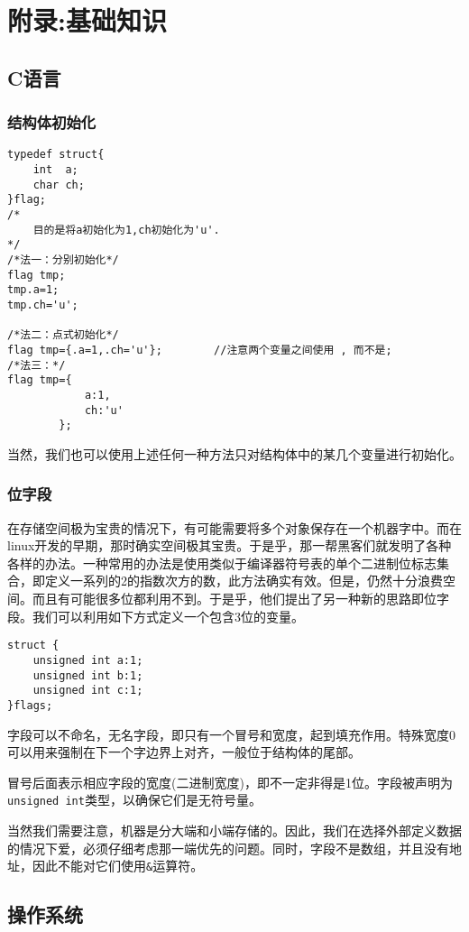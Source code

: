 \chapter{附录:基础知识}
	\section{C语言}
		\subsection{结构体初始化}
\begin{verbatim}
typedef struct{
	int  a;
	char ch;
}flag;
/*
	目的是将a初始化为1,ch初始化为'u'.
*/
/*法一：分别初始化*/
flag tmp;
tmp.a=1;
tmp.ch='u';

/*法二：点式初始化*/
flag tmp={.a=1,.ch='u'};		//注意两个变量之间使用 , 而不是;
/*法三：*/
flag tmp={
			a:1,
			ch:'u'
		};
\end{verbatim}
			当然，我们也可以使用上述任何一种方法只对结构体中的某几个变量进行初始化。

		\subsection{位字段}
			在存储空间极为宝贵的情况下，有可能需要将多个对象保存在一个机器字中。而在linux开发的早期，那时确实空间极其宝贵。于是乎，那一帮黑客们就发明了各种各样的办法。一种常用的办法是使用类似于编译器符号表的单个二进制位标志集合，即定义一系列的2的指数次方的数，此方法确实有效。但是，仍然十分浪费空间。而且有可能很多位都利用不到。于是乎，他们提出了另一种新的思路即位字段。我们可以利用如下方式定义一个包含3位的变量。

\begin{verbatim}
struct {
	unsigned int a:1;
	unsigned int b:1;
	unsigned int c:1;
}flags;
\end{verbatim}
			
			字段可以不命名，无名字段，即只有一个冒号和宽度，起到填充作用。特殊宽度0可以用来强制在下一个字边界上对齐，一般位于结构体的尾部。
			
			冒号后面表示相应字段的宽度(二进制宽度)，即不一定非得是1位。字段被声明为\texttt{unsigned int}类型，以确保它们是无符号量。

			当然我们需要注意，机器是分大端和小端存储的。因此，我们在选择外部定义数据的情况下爱，必须仔细考虑那一端优先的问题。同时，字段不是数组，并且没有地址，因此不能对它们使用\texttt{&}运算符。	
	\section{操作系统}
